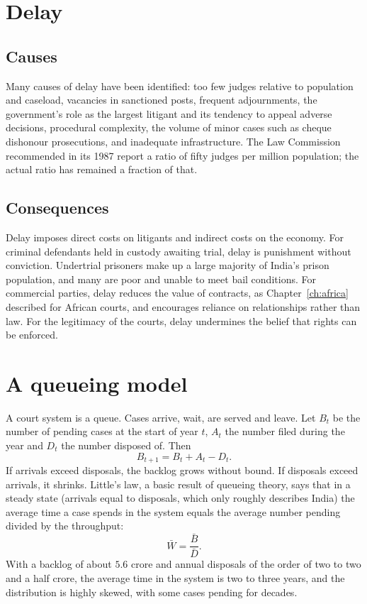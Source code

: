 \section{Delay}

\subsection{Causes}

Many causes of delay have been identified: too few judges relative to population and caseload, vacancies in sanctioned posts, frequent adjournments, the government's role as the largest litigant and its tendency to appeal adverse decisions, procedural complexity, the volume of minor cases such as cheque dishonour prosecutions, and inadequate infrastructure. The Law Commission recommended in its 1987 report a ratio of fifty judges per million population; the actual ratio has remained a fraction of that.

\subsection{Consequences}

Delay imposes direct costs on litigants and indirect costs on the economy. For criminal defendants held in custody awaiting trial, delay is punishment without conviction. Undertrial prisoners make up a large majority of India's prison population, and many are poor and unable to meet bail conditions. For commercial parties, delay reduces the value of contracts, as Chapter~\ref{ch:africa} described for African courts, and encourages reliance on relationships rather than law. For the legitimacy of the courts, delay undermines the belief that rights can be enforced.

\section{A queueing model}

A court system is a queue. Cases arrive, wait, are served and leave. Let $B_t$ be the number of pending cases at the start of year $t$, $A_t$ the number filed during the year and $D_t$ the number disposed of. Then
\begin{equation}
B_{t+1} = B_t + A_t - D_t .
\end{equation}
If arrivals exceed disposals, the backlog grows without bound. If disposals exceed arrivals, it shrinks. Little's law, a basic result of queueing theory, says that in a steady state (arrivals equal to disposals, which only roughly describes India) the average time a case spends in the system equals the average number pending divided by the throughput:
\begin{equation}
\bar W = \frac{\bar B}{\bar D}.
\end{equation}
With a backlog of about $5.6$ crore and annual disposals of the order of two to two and a half crore, the average time in the system is two to three years, and the distribution is highly skewed, with some cases pending for decades.


